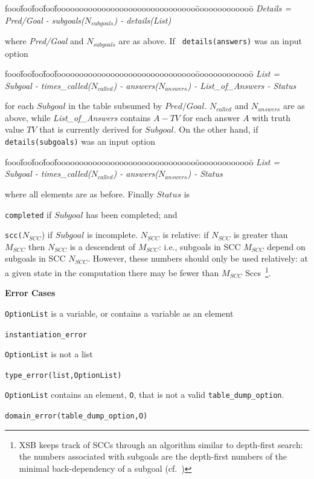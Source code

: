 \begin{description}
\begin{tabbing}
fooo\=foo\=foo\=foo\=fooooooooooooooooooooooooooooooo\=ooooooooooooo\=\kill
%
{\em   Details = } \\
\> {\em Pred/Goal  - subgoals($N_{subgoals}$) - details(List)}
%
\end{tabbing}
%
where {\em Pred/Goal} and $N_{subgoals}$ are as above.  If {\tt
  details(answers)} was an input option
%
\begin{tabbing}
fooo\=foo\=foo\=foo\=fooooooooooooooooooooooooooooooo\=ooooooooooooo\=\kill
%
{\em List = }\\
\>  {\em Subgoal - times\_called($N_{called}$) - answers($N_{answers}$) - List\_of\_Answers - Status}
%
\end{tabbing}
%
for each $Subgoal$ in the table subsumed by $Pred/Goal$.  $N_{called}$
and $N_{answers}$ are as above, while {\em List\_of\_Answers} contains
$A-TV$ for each answer $A$ with truth value $TV$ that is currently
derived for $Subgoal$.  On the other hand, if {\tt details(subgoals)}
was an input option
\begin{tabbing}
fooo\=foo\=foo\=foo\=fooooooooooooooooooooooooooooooo\=ooooooooooooo\=\kill
%
{\em List = }\\
\>  {\em Subgoal - times\_called($N_{called}$) - answers($N_{answers}$) - Status}
%
\end{tabbing}
%
where all elements are as before.  Finally $Status$ is
%
\bi
\item {\tt completed} if $Subgoal$ has been completed; and
%
\item {\tt scc($N_{SCC}$}) if $Subgoal$ is incomplete.  $N_{SCC}$ is
  relative: if $N_{SCC}$ is greater than $M_{SCC}$ then $N_{SCC}$ is a
  descendent of $M_{SCC}$: i.e., subgoals in SCC $M_{SCC}$ depend on
  subgoals in SCC $N_{SCC}$.  However, these numbers should only be
  used relatively: at a given state in the computation there may be
  fewer than $M_{SCC}$ Sccs~\footnote{XSB keeps track of SCCs through
    an algorithm similar to depth-first search: the numbers associated
    with subgoals are the depth-first numbers of the minimal
    back-dependency of a subgoal (cf.~\cite{SaSw98})}.
\ei


{\bf Error Cases}
\bi
\item {\tt OptionList} is a variable, or contains a variable as an element
\bi
\item {\tt instantiation\_error}
\ei
\item {\tt OptionList} is not a list
\bi
\item {\tt type\_error(list,OptionList)}
\ei
\item {\tt OptionList} contains an element, {\tt O}, that is not a
  valid {\tt table\_dump\_option}.
\bi
\item {\tt domain\_error(table\_dump\_option,O)}
\ei
\ei
\end{description}


